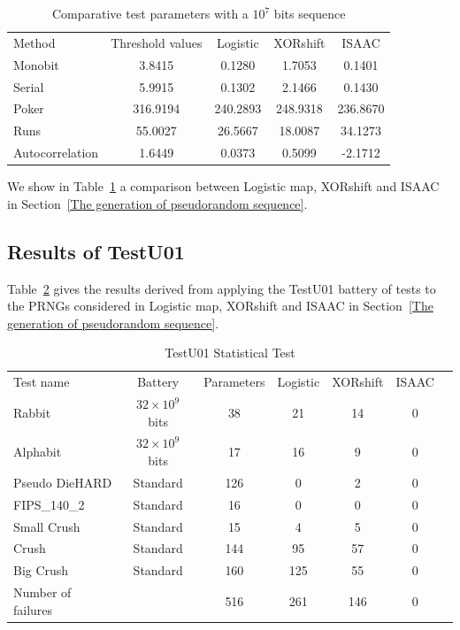 \begin{table}[!t]
\renewcommand{\arraystretch}{1.3}
\caption{Comparative test parameters with a $10^7$ bits sequence}
\label{Comparison3}
\centering
  \begin{tabular}{lcccc}
   \toprule
Method			&Threshold values 	 		&Logistic	& XORshift	& ISAAC\\
Monobit			&3.8415					&0.1280		&1.7053		&0.1401\\ \hline
Serial  		&5.9915 				&0.1302		&2.1466		&0.1430  \\ \hline
Poker  			&316.9194 				&240.2893	&248.9318	&236.8670  \\ \hline
Runs 			&55.0027				&26.5667	&18.0087	&34.1273   \\ \hline
Autocorrelation		&1.6449			 		& 0.0373	&0.5099 	&-2.1712  \\ 
\bottomrule
  \end{tabular}
\end{table}

We show in Table~\ref{Comparison3} a comparison between Logistic map, XORshift and ISAAC in Section~\ref{The generation of pseudorandom sequence}. 



\subsection{Results of TestU01}

Table~\ref{TestU011} gives the results derived from applying the TestU01 battery of tests to the PRNGs considered in Logistic map, XORshift and ISAAC in Section~\ref{The generation of pseudorandom sequence}.
\begin{table}[!t]
\renewcommand{\arraystretch}{1.3}
\caption{TestU01 Statistical Test}
\label{TestU011}
\centering
  \begin{tabular}{lcccccc}
    \toprule
Test name &Battery&Parameters& Logistic 		& XORshift	& ISAAC\\
Rabbit 				&$32\times10^9$ bits  	&38	&21  	 	&14	&0	 \\
Alphabit 			&$32\times10^9$ bits	&17	&16 		&9	&0	 \\
Pseudo DieHARD 			&Standard		&126	&0 	 	&2	&0	\\
FIPS\_140\_2 			&Standard		&16	&0 		&0	&0	\\
Small Crush 			&Standard		&15	&4 		&5	&0	 \\
Crush 				&Standard		&144	&95 		&57	&0	 \\
Big Crush 			&Standard		&160	&125 	 	&55	&0	 \\ \hline
Number of failures 		& 			&516	&261 	 	&146	&0	 \\
\bottomrule
  \end{tabular}
\end{table}



